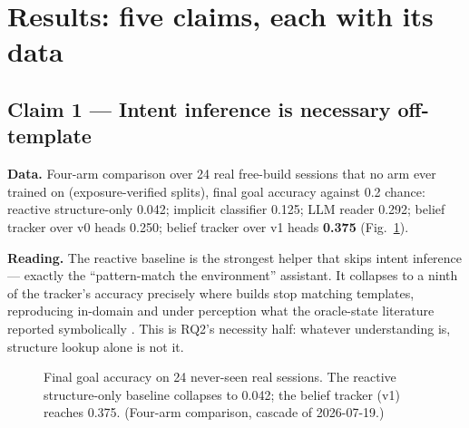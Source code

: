 \documentclass[11pt]{article}
\begin{document}
\section{Results: five claims, each with its data}

\subsection{Claim 1 --- Intent inference is necessary off-template}
\label{sec:claim1}

\textbf{Data.} Four-arm comparison over 24 real free-build sessions that no
arm ever trained on (exposure-verified splits), final goal accuracy against
0.2 chance: reactive structure-only 0.042; implicit classifier 0.125; LLM
reader 0.292; belief tracker over v0 heads 0.250; belief tracker over v1 heads
\textbf{0.375} (Fig.~\ref{fig:necessity}).

\textbf{Reading.} The reactive baseline is the strongest helper that skips
intent inference --- exactly the ``pattern-match the environment'' assistant.
It collapses to a ninth of the tracker's accuracy precisely where builds stop
matching templates, reproducing in-domain and under perception what the
oracle-state literature reported symbolically \cite{wah,nopa}. This is RQ2's
necessity half: whatever understanding is, structure lookup alone is not it.

\begin{figure}[ht]
\centering
{}
\caption{Final goal accuracy on 24 never-seen real sessions. The reactive
structure-only baseline collapses to 0.042; the belief tracker (v1) reaches
0.375. (Four-arm comparison, cascade of 2026-07-19.)}
\label{fig:necessity}
\end{figure}
\end{document}
